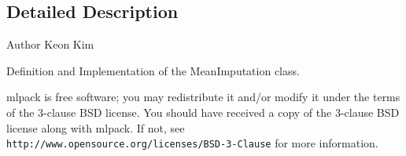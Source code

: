 \subsection{Detailed Description}
\begin{DoxyAuthor}{Author}
Keon Kim
\end{DoxyAuthor}
Definition and Implementation of the Mean\+Imputation class.

mlpack is free software; you may redistribute it and/or modify it under the terms of the 3-\/clause B\+SD license. You should have received a copy of the 3-\/clause B\+SD license along with mlpack. If not, see {\tt http\+://www.\+opensource.\+org/licenses/\+B\+S\+D-\/3-\/\+Clause} for more information. 